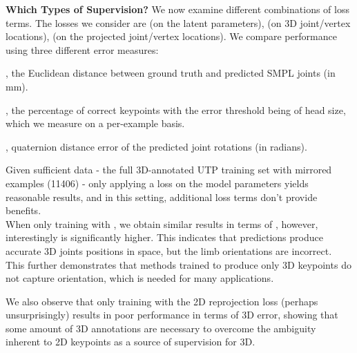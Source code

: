 \documentclass[10pt,twocolumn,letterpaper]{article}
\begin{document}
\textbf{Which Types of Supervision?} We now examine different combinations of loss terms.
The losses we consider are  (on the latent parameters),  (on 3D joint/vertex locations), 
 (on the projected joint/vertex locations).
We compare performance using three different error measures: 
     \begin{inparaenum}[(i)]
       \item , the Euclidean distance between ground truth and predicted SMPL joints (in mm).
       \item  \cite{andriluka_mpii2d_cvpr14}, the percentage of correct keypoints with the error threshold being  of head size, which we measure on a per-example basis.
       \item , quaternion distance error of the predicted joint rotations (in radians).
     \end{inparaenum}

Given sufficient data - the full 3D-annotated UTP training set with mirrored examples (11406) - only applying a loss on the 
model parameters yields reasonable results, and in this setting, additional loss terms don't provide benefits. \\
When only training with , we obtain similar results in terms of , however, interestingly 
is significantly higher. This indicates that predictions produce accurate 3D joints positions in space, but the limb orientations are incorrect. 
This further demonstrates that methods trained to produce only 3D keypoints do not capture orientation, which is needed for many applications.

We also observe that only training with the 2D reprojection loss (perhaps unsurprisingly) 
results in poor performance in terms of 3D error, showing that some amount of 3D annotations are necessary to overcome 
the ambiguity inherent to 2D keypoints as a source of supervision for 3D. 
\end{document}
